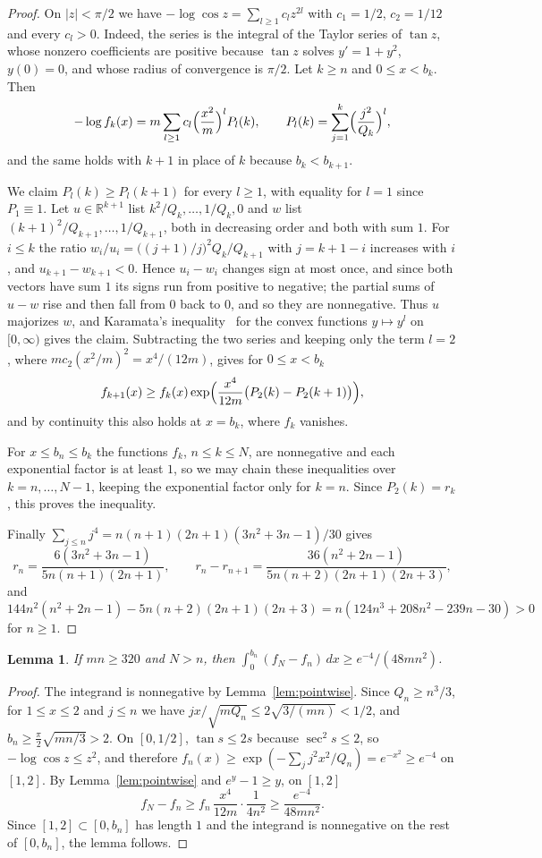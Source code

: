 \documentclass[11pt]{article}
\newtheorem{lemma}[theorem]{Lemma}
\theoremstyle{remark}
\begin{document}
\begin{proof}
On $|z|<\pi/2$ we have $-\log\cos z=\sum_{l\ge1}c_lz^{2l}$ with $c_1=1/2$, $c_2=1/12$ and every $c_l>0$. Indeed, the series is the integral of the Taylor series of $\tan z$, whose nonzero coefficients are positive because $\tan z$ solves $y'=1+y^2$, $y(0)=0$, and whose radius of convergence is $\pi/2$. Let $k\ge n$ and $0\le x<b_k$. Then
\[
-\log f_k(x)=m\sum_{l\ge1}c_l\Bigl(\frac{x^2}{m}\Bigr)^lP_l(k),\qquad P_l(k)=\sum_{j=1}^k\Bigl(\frac{j^2}{Q_k}\Bigr)^l,
\]
and the same holds with $k+1$ in place of $k$ because $b_k<b_{k+1}$.

We claim $P_l(k)\ge P_l(k+1)$ for every $l\ge1$, with equality for $l=1$ since $P_1\equiv1$. Let $u\in\mathbb R^{k+1}$ list $k^2/Q_k,\dots,1/Q_k,0$ and $w$ list $(k+1)^2/Q_{k+1},\dots,1/Q_{k+1}$, both in decreasing order and both with sum $1$. For $i\le k$ the ratio $w_i/u_i=\bigl((j+1)/j\bigr)^2Q_k/Q_{k+1}$ with $j=k+1-i$ increases with $i$, and $u_{k+1}-w_{k+1}<0$. Hence $u_i-w_i$ changes sign at most once, and since both vectors have sum $1$ its signs run from positive to negative; the partial sums of $u-w$ rise and then fall from $0$ back to $0$, and so they are nonnegative. Thus $u$ majorizes $w$, and Karamata's inequality~\cite[Chapter~3, Proposition~C.1]{MOA11} for the convex functions $y\mapsto y^l$ on $[0,\infty)$ gives the claim. Subtracting the two series and keeping only the term $l=2$, where $mc_2(x^2/m)^2=x^4/(12m)$, gives for $0\le x<b_k$
\[
f_{k+1}(x)\ge f_k(x)\exp\Bigl(\frac{x^4}{12m}\bigl(P_2(k)-P_2(k+1)\bigr)\Bigr),
\]
and by continuity this also holds at $x=b_k$, where $f_k$ vanishes.

For $x\le b_n\le b_k$ the functions $f_k$, $n\le k\le N$, are nonnegative and each exponential factor is at least $1$, so we may chain these inequalities over $k=n,\dots,N-1$, keeping the exponential factor only for $k=n$. Since $P_2(k)=r_k$, this proves the inequality.

Finally $\sum_{j\le n}j^4=n(n+1)(2n+1)(3n^2+3n-1)/30$ gives
\[
r_n=\frac{6(3n^2+3n-1)}{5n(n+1)(2n+1)},\qquad r_n-r_{n+1}=\frac{36(n^2+2n-1)}{5n(n+2)(2n+1)(2n+3)},
\]
and $144n^2(n^2+2n-1)-5n(n+2)(2n+1)(2n+3)=n(124n^3+208n^2-239n-30)>0$ for $n\ge1$.
\end{proof}

\begin{lemma}\label{lem:gain}
If $mn\ge320$ and $N>n$, then $\int_0^{b_n}(f_N-f_n)\,dx\ge e^{-4}/(48mn^2)$.
\end{lemma}

\begin{proof}
The integrand is nonnegative by Lemma~\ref{lem:pointwise}. Since $Q_n\ge n^3/3$, for $1\le x\le2$ and $j\le n$ we have $jx/\sqrt{mQ_n}\le2\sqrt{3/(mn)}<1/2$, and $b_n\ge\frac\pi2\sqrt{mn/3}>2$. On $[0,1/2]$, $\tan s\le2s$ because $\sec^2s\le2$, so $-\log\cos z\le z^2$, and therefore $f_n(x)\ge\exp(-\sum_j j^2x^2/Q_n)=e^{-x^2}\ge e^{-4}$ on $[1,2]$. By Lemma~\ref{lem:pointwise} and $e^y-1\ge y$, on $[1,2]$
\[
f_N-f_n\ge f_n\,\frac{x^4}{12m}\cdot\frac{1}{4n^2}\ge\frac{e^{-4}}{48mn^2}.
\]
Since $[1,2]\subset[0,b_n]$ has length $1$ and the integrand is nonnegative on the rest of $[0,b_n]$, the lemma follows.
\end{proof}
\end{document}
